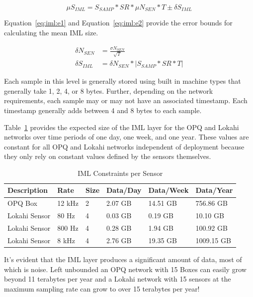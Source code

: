 \begin{equation}\label{eq:iml:mu_size_iml}
\mu S_{IML} = S_{SAMP} * SR * \mu N_{SEN} * T \pm \delta S_{IML}
\end{equation}

Equation~\ref{eq:iml:e1} and Equation~\ref{eq:iml:e2} provide the error bounds for calculating the mean IML size.

\begin{align}
	\delta N_{SEN} &= \frac{\sigma N_{SEN}}{\sqrt{T}} \label{eq:iml:e1} \\
	\delta S_{IML} &= \delta N_{SEN} * |S_{SAMP} * SR * T| \label{eq:iml:e2}
\end{align}

Each sample in this level is generally stored using built in machine types that generally take 1, 2, 4, or 8 bytes. Further, depending on the network requirements, each sample may or may not have an associated timestamp. Each timestamp generally adds between 4 and 8 bytes to each sample.

Table~\ref{table:iml_size} provides the expected size of the IML layer for the OPQ and Lokahi networks over time periods of one day, one week, and one year. These values are constant for all OPQ and Lokahi networks independent of deployment because they only rely on constant values defined by the sensors themselves.

\begin{table}[H]
	\centering
	\caption{IML Constraints per Sensor}
	\begin{tabularx}{\textwidth}{Xlllll}
		\toprule
		\textbf{Description} & \textbf{Rate} & \textbf{Size} & \textbf{Data/Day} & \textbf{Data/Week} & \textbf{Data/Year} \\
		\midrule
		OPQ Box & 12 kHz & 2 & 2.07 GB & 14.51 GB & 756.86 GB \\
		Lokahi Sensor & 80 Hz & 4 & 0.03 GB & 0.19 GB & 10.10 GB \\
		Lokahi Sensor & 800 Hz & 4 & 0.28 GB & 1.94 GB & 100.92 GB \\
		Lokahi Sensor & 8 kHz & 4 & 2.76 GB & 19.35 GB & 1009.15 GB \\
		\bottomrule
	\end{tabularx}
	\label{table:iml_size}
\end{table}

It's evident that the IML layer produces a significant amount of data, most of which is noise. Left unbounded an OPQ network with 15 Boxes can easily grow beyond 11 terabytes per year and a Lokahi network with 15 sensors at the maximum sampling rate can grow to over 15 terabytes per year!

